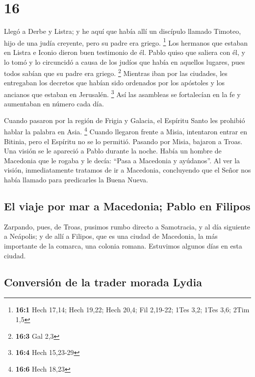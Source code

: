 \hypertarget{section-15}{%
\section{16}\label{section-15}}

 Llegó a Derbe y Listra; y he aquí que había allí un
discípulo llamado Timoteo, hijo de una judía creyente, pero su padre era
griego. \footnote{\textbf{16:1} Hech 17,14; Hech 19,22; Hech 20,4; Fil
  2,19-22; 1Tes 3,2; 1Tes 3,6; 2Tim 1,5}  Los hermanos que
estaban en Listra e Iconio dieron buen testimonio de él. 
Pablo quiso que saliera con él, y lo tomó y lo circuncidó a causa de los
judíos que había en aquellos lugares, pues todos sabían que su padre era
griego. \footnote{\textbf{16:3} Gal 2,3}  Mientras iban
por las ciudades, les entregaban los decretos que habían sido ordenados
por los apóstoles y los ancianos que estaban en Jerusalén. \footnote{\textbf{16:4}
  Hech 15,23-29}  Así las asambleas se fortalecían en la
fe y aumentaban en número cada día.

 Cuando pasaron por la región de Frigia y Galacia, el
Espíritu Santo les prohibió hablar la palabra en Asia. \footnote{\textbf{16:6}
  Hech 18,23}  Cuando llegaron frente a Misia, intentaron
entrar en Bitinia, pero el Espíritu no se lo permitió. 
Pasando por Misia, bajaron a Troas.  Una visión se le
apareció a Pablo durante la noche. Había un hombre de Macedonia que le
rogaba y le decía: ``Pasa a Macedonia y ayúdanos''.  Al
ver la visión, inmediatamente tratamos de ir a Macedonia, concluyendo
que el Señor nos había llamado para predicarles la Buena Nueva.

\hypertarget{el-viaje-por-mar-a-macedonia-pablo-en-filipos}{%
\subsection{El viaje por mar a Macedonia; Pablo en
Filipos}\label{el-viaje-por-mar-a-macedonia-pablo-en-filipos}}

 Zarpando, pues, de Troas, pusimos rumbo directo a
Samotracia, y al día siguiente a Neápolis;  y de allí a
Filipos, que es una ciudad de Macedonia, la más importante de la
comarca, una colonia romana. Estuvimos algunos días en esta ciudad.

\hypertarget{conversiuxf3n-de-la-trader-morada-lydia}{%
\subsection{Conversión de la trader morada
Lydia}\label{conversiuxf3n-de-la-trader-morada-lydia}}

